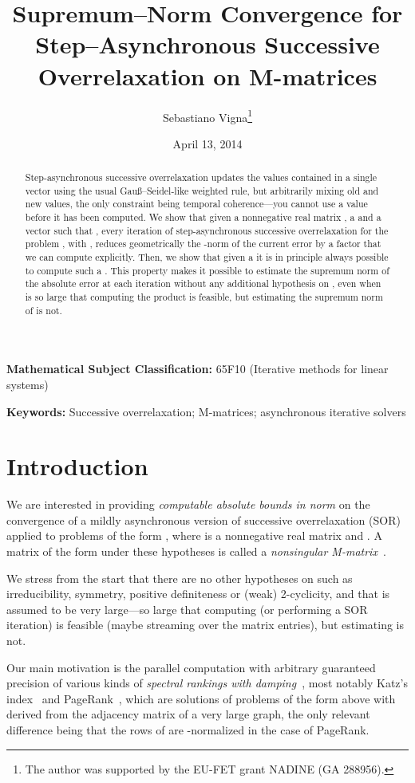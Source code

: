 \documentclass{article}
\date{
April 13, 2014}
\title{Supremum--Norm Convergence for Step--Asynchronous Successive
Overrelaxation on M-matrices}
\author{Sebastiano Vigna\thanks{The author was supported by the EU-FET
grant NADINE (GA 288956).}}
\newcommand{\Gauss}{Gau\ss}
\newcommand{\1}{\mathbf 1}
\begin{document}


\maketitle

\begin{abstract}
Step-asynchronous successive overrelaxation updates the values contained in
a single vector using the usual \Gauss--Seidel-like weighted rule, but 
arbitrarily mixing old and new values, the only constraint being temporal
coherence---you cannot use a value before it has been
computed. We show that given a nonnegative real matrix
, a  and a vector  such that , every iteration of
step-asynchronous successive overrelaxation for the problem , with , reduces geometrically the -norm of the current error
by a factor that we can compute explicitly. Then, we show that given a
 it is in principle always possible to compute such a .
This property makes it possible to estimate the supremum norm of the absolute
error at each iteration without any additional hypothesis on , even when 
is so large that computing the product  is feasible, but estimating the
supremum norm of  is not.
\end{abstract}

\noindent\textbf{Mathematical Subject Classification:} 65F10  	(Iterative
methods for linear systems)

\noindent\textbf{Keywords:} Successive overrelaxation; M-matrices; asynchronous
iterative solvers

\section{Introduction}

We are interested in providing \emph{computable absolute bounds in  norm} 
on the convergence of
a mildly asynchronous version of successive overrelaxation (SOR)
applied to problems of the form , where  is a
nonnegative real matrix and . A matrix of the form  under
these hypotheses is called a \emph{nonsingular M-matrix}~\cite{BePNMMS}.

We stress from the start that there are no other hypotheses on  such as
irreducibility, symmetry, positive definiteness or (weak) 2-cyclicity, and that
 is assumed to be very large---so large that computing  (or
performing a SOR iteration) is feasible (maybe streaming over the matrix
entries), but estimating  is not.

Our main motivation is the parallel computation with arbitrary guaranteed
precision of various kinds of \emph{spectral rankings with
damping}~\cite{VigSR}, most notably Katz's index~\cite{KatNSIDSA} and
PageRank~\cite{PBMPCR}, which are solutions of problems of the form above with
 derived from the adjacency matrix of a very large graph, the only relevant
difference being that the rows of  are -normalized in the case of PageRank.
\end{document}
